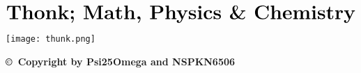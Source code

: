 \documentclass{article}
\begin{document}
\begin{align*}
    \textbf{\huge{Thonk; Math, Physics \& Chemistry}}\\
\end{align*}
\begin{center}
    \texttt{[image: thunk.png]}
\end{center}
\vspace*{\fill}
\begin{center}
    \textbf{\copyright~Copyright by Psi25Omega and NSPKN6506}\\
\end{center}
\newpage
\tableofcontents
\newpage

\newpage

\end{document}

